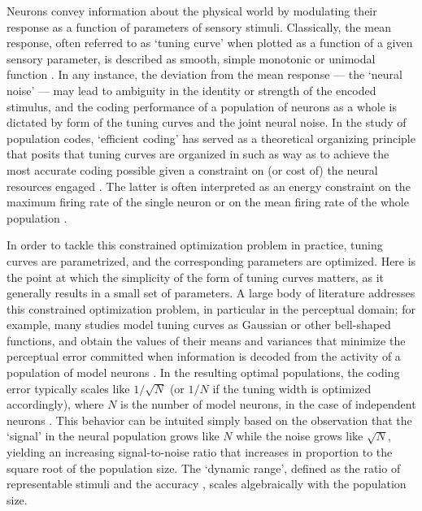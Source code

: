 \documentclass[a4paper]{article}%
\begin{document}
Neurons convey information about the physical world by modulating their
response as a function of parameters of sensory stimuli. Classically, the mean
response, often referred to as `tuning curve' when plotted as a function of a
given sensory parameter, is described as smooth, simple monotonic or unimodal
function
\cite[]{Hubel1959ReceptiveCortex,Georgopoulos1982OnCortex,Taube1990Head-directionAnalysis,Miller1991RepresentationInterneurons,Bremmer1997EyeMST,Dayan2001TheoreticalSystems,Kayaert2005TuningCortex}. In any instance, the deviation from
the mean response --- the `neural noise' --- may lead to ambiguity in the
identity or strength of the encoded stimulus, and the coding performance of a
population of neurons as a whole is dictated by form of the tuning curves and
the joint neural noise. In the study of population codes, `efficient coding'
has served as a theoretical organizing principle that posits that tuning
curves are organized in such as way as to achieve the most accurate coding
possible given a constraint on (or cost of) the neural resources engaged
\cite[]{Barlow1961PossibleMessages,Atick1990TowardsProcessing,Lewicki2002EfficientSounds}. The latter is often interpreted as an energy constraint on the maximum firing rate of the single neuron or on the mean firing rate of the whole population
\cite[]{Zhang1999NeuronalBroaden,Bethge2002OptimalFails,Wang2016EfficientError} .

In order to tackle this constrained optimization problem in practice, tuning
curves are parametrized, and the corresponding parameters are optimized. Here
is the point at which the simplicity of the form of tuning curves matters, as
it generally results in a small set of parameters. A large body of literature
addresses this constrained optimization problem, in particular in the
perceptual domain; for example, many studies model tuning curves as Gaussian
or other bell-shaped functions, and obtain the values of their means and
variances that minimize the perceptual error committed when information is
decoded from the activity of a population of model neurons
\cite[]{Zhang1999NeuronalBroaden,Deneve1999ReadingObservers,Yaeli2010Error-basedNeurons,Ganguli2014EfficientPopulations,Fiscella2015VisualNeurons}. In
the resulting optimal populations, the coding error typically scales like
$1/\sqrt{N}$ (or $1/N$ if the tuning width is optimized accordingly),  where $N$ is the number of model neurons, in the case of
independent neurons
\cite[]{Seung1993SimpleCodes,Berens2011ReassessingFunctions,Kim2020SuperlinearCodes}. This behavior can be intuited simply based on the observation that
the `signal' in the neural population grows like $N$ while the noise grows
like $\sqrt{N}$, yielding an increasing signal-to-noise ratio that increases
in proportion to the square root of the population size. The `dynamic range', defined as the ratio of representable stimuli and the accuracy \cite[]{Burak2014SpatialCortex}, scales algebraically with the population size.
\end{document}
